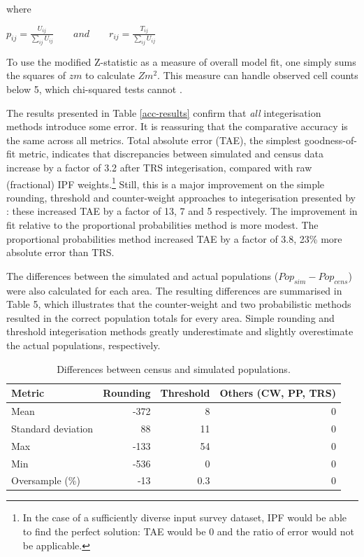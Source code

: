 \documentclass[a4paper, 11pt, twoside]{Thesis}
\begin{document}
where

\begin{center}
\begin{math}
  p_{ij} = \frac{U_{ij}}{\sum\limits_{ij}U_{ij}} \qquad and \qquad r_{ij} =
\frac{T_{ij}}{\sum\limits_{ij}U_{ij}}
\end{math}
\end{center}

To use the modified Z-statistic as a measure of overall model fit, one simply
sums the squares of $zm$ to calculate $Z{m}^{2}$. This measure can handle
observed cell counts below 5, which chi-squared tests cannot \citep{Voas2001}.

The results presented in Table \ref{acc-results} confirm that \emph{all}
integerisation methods introduce
some error. It is reassuring that the comparative accuracy is the same across
all metrics. Total absolute error (TAE), the simplest goodness-of-fit
metric, indicates that discrepancies between simulated and census data increase
by a factor of 3.2 after TRS integerisation, compared with raw
(fractional) IPF weights.\footnote{In the case of a sufficiently diverse input
survey dataset, IPF would be able to find the perfect solution: TAE would be 0
and the ratio of error would not be
applicable.}
Still, this is a
major improvement on the simple rounding, threshold and counter-weight
approaches to integerisation presented by \citet{Ballas2005c}: these increased
TAE by a factor of 13, 7 and 5 respectively.
The improvement in fit relative to the proportional probabilities method
is more modest. The proportional probabilities method increased TAE by a factor
of 3.8, 23\% more absolute error than TRS.

The differences between the simulated and actual populations ($Pop_{sim} -
Pop_{cens}$) were also calculated for
each area. The resulting differences are summarised in Table 5, which
illustrates that the counter-weight and two probabilistic methods resulted
in the correct population totals for every area. Simple rounding and threshold
integerisation methods greatly underestimate and slightly overestimate the
actual populations, respectively.

\begin{table}[h*]
\begin{center}
\caption{Differences between census and simulated populations.}
\vspace{0.25 cm}
\begin{tabular}{lrrr}
\toprule
Metric & \multicolumn{1}{l}{Rounding} & \multicolumn{1}{l}{Threshold} &
\multicolumn{1}{l}{Others (CW, PP, TRS)} \\ \midrule
Mean & -372 & 8 & 0  \\
Standard deviation & 88 & 11 & 0 \\
Max & -133 & 54 & 0 \\
Min & -536 & 0 & 0 \\
Oversample (\%) & -13 & 0.3 & 0 \\
\bottomrule
\end{tabular}
\end{center}
\label{t:pops}
\end{table}
\end{document}
